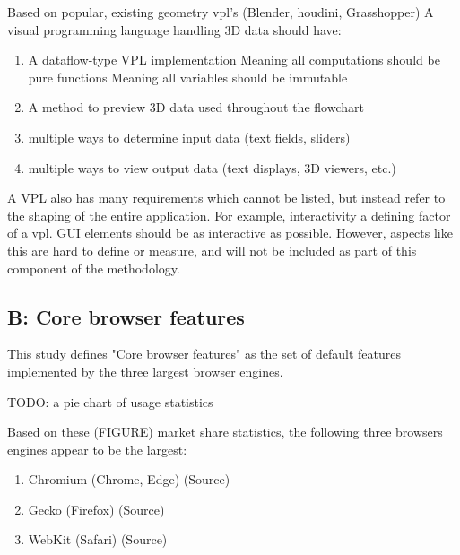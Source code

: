 Based on popular, existing geometry vpl's (Blender, houdini, Grasshopper) A visual programming language handling 3D data should have:
\begin{enumerate}[-]
  \item A dataflow-type VPL implementation
  \subitem Meaning all computations should be pure functions
  \subitem Meaning all variables should be immutable
  \item A method to preview 3D data used throughout the flowchart
  \item multiple ways to determine input data (text fields, sliders) 
  \item multiple ways to view output data (text displays, 3D viewers, etc.)
\end{enumerate}

A VPL also has many requirements which cannot be listed, but instead refer to the shaping of the entire application. 
For example, interactivity a defining factor of a vpl. GUI elements should be as interactive as possible.
However, aspects like this are hard to define or measure, and will not be included as part of this component of the methodology. 



\subsection*{B: Core browser features}
This study defines "Core browser features" as the set of default features implemented by the three largest browser engines. 
\begin{note}
TODO: a pie chart of usage statistics
\end{note}
Based on these (FIGURE) market share statistics, the following three browsers engines appear to be the largest:
\begin{enumerate}[-]
  \item Chromium (Chrome, Edge) (Source)
  \item Gecko (Firefox) (Source)
  \item WebKit (Safari) (Source)
\end{enumerate}


